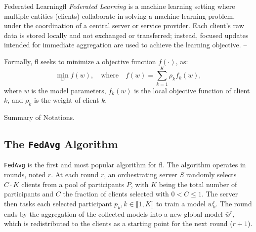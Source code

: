\begin{definitionbox}{Federated Learning}{fl}
  \emph{Federated Learning} is a machine learning setting where multiple entities (clients) collaborate in solving a machine learning problem, under the coordination of a central server or service provider.
  Each client’s raw data is stored locally and not exchanged or transferred; instead, focused updates intended for immediate aggregation are used to achieve the learning objective. -- \textcite{kairouz_AdvancesOpenProblems_2021}

  \tcblower

  Formally, \gls{fl} seeks to minimize a objective function $f(\cdot)$\footnotemark, as:
  \begin{equation}
    \min_{w} f(w), \quad \text{where} \quad f(w) = \sum_{k=1}^{K} \rho_k f_k(w),
  \end{equation}
  where $w$ is the model parameters, $f_k(w)$ is the local objective function of client $k$, and $\rho_k$ is the weight of client $k$.

\end{definitionbox}


\begin{table}[ht]
  \centering
  \caption{Summary of Notations.\label{tbl:notations}}
  
\end{table}


\subsection{The \texttt{FedAvg} Algorithm\label{sec:bg.fl.fedavg}}

\texttt{FedAvg} is the first and most popular algorithm for \gls{fl}.
The algorithm operates in rounds, noted $r$.
At each round $r$, an orchestrating server $S$ randomly selects $C \cdot K$ clients from a pool of participants $P$, with $K$ being the total number of participants and $C$ the fraction of clients selected with $0 < C \leq 1$.
The server then tasks each selected participant $p_k, k\in \llbracket 1,K \rrbracket$ to train a model $w_k^r$.
The round ends by the aggregation of the collected models into a new global model $\bar{w}^r$, which is redistributed to the clients as a starting point for the next round ($r+1$).

